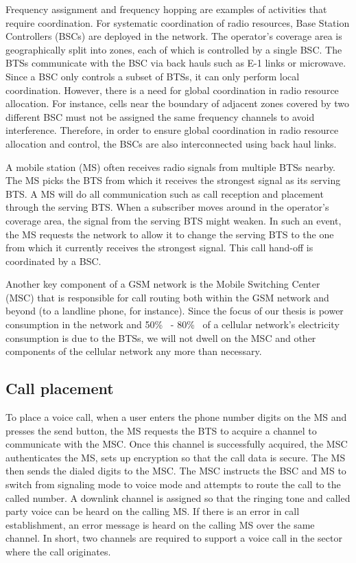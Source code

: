 Frequency assignment and frequency hopping are examples of activities that require coordination. For systematic coordination of radio resources, Base Station Controllers (BSCs) are deployed in the network. The operator's coverage area is geographically split into zones, each of which is controlled by a single BSC. The BTSs communicate with the BSC via back hauls such as E-1 links or microwave. Since a BSC only controls a subset of BTSs, it can only perform local coordination. However, there is a need for global coordination in radio resource allocation. For instance, cells near the boundary of adjacent zones covered by two different BSC must not be assigned the same frequency channels to avoid interference. Therefore, in order to ensure global coordination in radio resource allocation and control, the BSCs are also interconnected using back haul links.

A mobile station (MS) often receives radio signals from multiple BTSs nearby. The MS picks the BTS from which it receives the strongest signal as its serving BTS. A MS will do all communication such as call reception and placement through the serving BTS. When a subscriber moves around in the operator's coverage area, the signal from the serving BTS might weaken. In such an event, the MS requests the network to allow it to change the serving BTS to the one from which it currently receives the strongest signal. This call hand-off is coordinated by a BSC. 

Another key component of a GSM network is the Mobile Switching Center (MSC) that is responsible for call routing both within the GSM network and beyond (to a landline phone, for instance). Since the focus of our thesis is power consumption in the network and 50\%~\cite{Louhi:2007:BTSPower:INTELEC} - 80\%~\cite{Oh:Comm:2011} of a cellular network's electricity consumption is due to the BTSs, we will not dwell on the MSC and other components of the cellular network any more than necessary.

\subsection{Call placement} %
To place a voice call, when a user enters the phone number digits on the MS and presses the send button, the MS requests the BTS to acquire a channel to communicate with the MSC. Once this channel is successfully acquired, the MSC authenticates the MS, sets up encryption so that the call data is secure. The MS then sends the dialed digits to the MSC. The MSC instructs the BSC and MS to switch from signaling mode to voice mode and attempts to route the call to the called number. A downlink channel is assigned so that the ringing tone and called party voice can be heard on the calling MS. If there is an error in call establishment, an error message is heard on the calling MS over the same channel. In short, two channels are required to support a voice call in the sector where the call originates.

